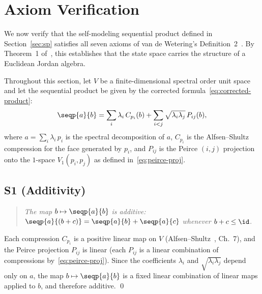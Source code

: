 
\section{Axiom Verification}\label{sec:axioms}

We now verify that the self-modeling sequential product defined in
Section~\ref{sec:sp} satisfies all seven axioms of van de
Wetering's Definition~2~\cite{vandeWetering2019b}. By Theorem~1 of~\cite{vandeWetering2019b},
this establishes that the state space carries the structure of a Euclidean
Jordan algebra.

Throughout this section, let $V$ be a finite-dimensional spectral order
unit space and let the sequential product be given by the corrected
formula~\eqref{eq:corrected-product}:
\begin{equation}\label{eq:sp-explicit}
  \seqp{a}{b}
  = \sum_i \lambda_i\, C_{p_i}(b)
  + \sum_{i<j} \sqrt{\lambda_i \lambda_j}\, P_{ij}(b),
\end{equation}
where $a = \sum_i \lambda_i\, p_i$ is the spectral decomposition of $a$,
$C_{p_i}$ is the Alfsen--Shultz compression for the face generated by
$p_i$, and $P_{ij}$ is the Peirce $(i,j)$ projection onto the
$1$-space $V_1(p_i, p_j)$ as defined in~\eqref{eq:peirce-proj}.

\subsection*{S1 (Additivity)}

\begin{quote}
\emph{The map $b \mapsto \seqp{a}{b}$ is additive:
$\seqp{a}{(b+c)} = \seqp{a}{b} + \seqp{a}{c}$
whenever $b + c \le \id$.}
\end{quote}

Each compression $C_{p_i}$ is a positive linear map on $V$
(Alfsen--Shultz~\cite{AlfsenShultz2003}, Ch.~7), and the Peirce
projection $P_{ij}$ is linear (each $P_{ij}$ is a linear combination
of compressions by~\eqref{eq:peirce-proj}). Since the coefficients $\lambda_i$ and
$\sqrt{\lambda_i\lambda_j}$ depend only on $a$, the map $b \mapsto
\seqp{a}{b}$ is a fixed linear combination of linear maps applied to $b$,
and therefore additive. \qed

